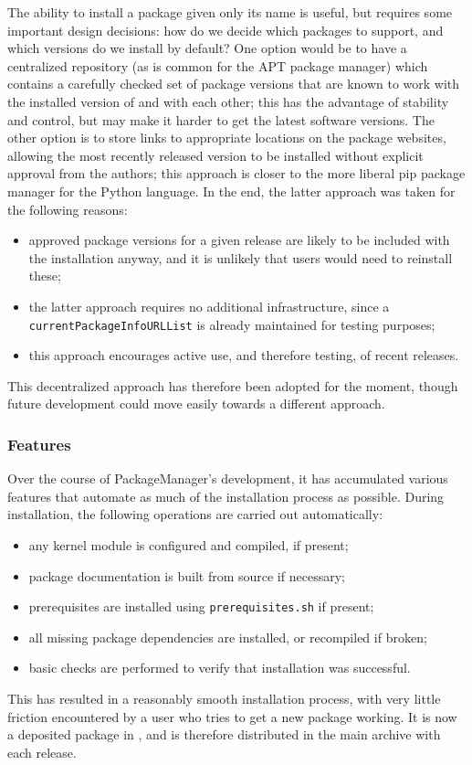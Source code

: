 The ability to install a package given only its name is useful, but requires
some important design decisions: how do we decide which packages to support, and
which versions do we install by default?  One option would be to have a
centralized repository (as is common for the {\sf APT} package manager) which
contains a carefully checked set of package versions that are known to work with
the installed version of \GAP and with each other; this has the advantage of
stability and control, but may make it harder to get the latest software
versions.  The other option is to store links to appropriate locations on the
package websites, allowing the most recently released version to be installed
without explicit approval from the \GAP authors; this approach is closer to the
more liberal {\sf pip} package manager for the Python language.
In the end, the latter approach was taken for the following reasons:
\begin{itemize}
\item approved package versions for a given release are likely to be included
  with the \GAP installation anyway, and it is unlikely that users would need
  to reinstall these;
\item the latter approach requires no additional infrastructure, since a
  \texttt{currentPackageInfoURLList} is already maintained for testing purposes;
\item this approach encourages active use, and therefore testing, of recent releases.
\end{itemize}
This decentralized approach has therefore been adopted for the moment, though
future development could move easily towards a different approach.

\subsubsection{Features}

Over the course of {\sf PackageManager}'s development, it has accumulated
various features that automate as much of the installation process as possible.
During installation, the following operations are carried out automatically:
\begin{itemize}
\item any kernel module is configured and compiled, if present;
\item package documentation is built from source if necessary;
\item prerequisites are installed using \texttt{prerequisites.sh} if present;
\item all missing package dependencies are installed, or recompiled if broken;
\item basic checks are performed to verify that installation was successful.
\end{itemize}
This has resulted in a reasonably smooth installation process, with very little
friction encountered by a user who tries to get a new package working.  It is
now a deposited package in \GAP, and is therefore distributed in the main
archive with each release.

